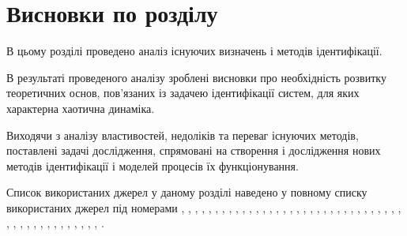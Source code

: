 

\section{Висновки по розділу \thechapter}%


В цьому розділі проведено аналіз існуючих визначень і методів
ідентифікації.

В результаті проведеного аналізу зроблені висновки про
необхідність розвитку теоретичних основ, пов'язаних із
задачею ідентифікації систем, для яких характерна хаотична
динаміка.

Виходячи з аналізу властивостей, недоліків та переваг існуючих методів,
поставлені задачі дослідження, спрямовані на створення і
дослідження нових методів ідентифікації і моделей процесів
їх функціонування.

Список використаних джерел у даному розділі наведено у повному
списку використаних джерел під номерами
\cite{adopt_cont_sys},
\cite{andronov_vitt_haikin},
\cite{atu_phd_thesis},
\cite{auto_optim_intask},
\cite{bodyan_adapt_viyavl},
\cite{borcov},
\cite{chen_nls_id_radial_basis},
\cite{chen_nn_for_nls_mod},
\cite{chernavskii_syn_info},
\cite{deith_method_id_ds},
\cite{dmitriev_trans_chaos_lowpower},
\cite{eykhoff_id_base},
\cite{eykhoff_modern_id},
\cite{gladkov_optim_nongrad},
\cite{gropp_methods_id},
\cite{ivah_int_meth_direct},
\cite{ivanov_stoh_alg_int},
\cite{karabutov_adapt_id_sys},
\cite{koltsova_nl_dyn_chem},
\cite{kozlov_nosearch_sns},
\cite{kras_dyn_nsn},
\cite{kubik_nlsc},
\cite{kuznetsov_dyn_chaos},
\cite{leondes_modern_tu},
\cite{lung_id_sys},
\cite{magni_theory_dyn_chaos},
\cite{mai_adopt_meth_direct},
\cite{mai_iss_adop_alg_etalon},
\cite{mai_sear_meth_akt_id_ns},
\cite{mai_syntez_adop_id},
\cite{medved_nepar_alg_id_nds},
\cite{mich_92},
\cite{mich_upr_prost_mech},
\cite{moon_chaotic_vibr},
\cite{narendra_id_ctl_ds_nn},
\cite{nelles_nlsys_id},
\cite{patra_nds_id_cheb},
\cite{prigogine_from_existent},
\cite{raibman_id_obj_ctl},
\cite{rastr_adop_complex_sys},
\cite{rastr_intro},
\cite{rastr_rand_search},
\cite{rastr_rand_search_adopt},
\cite{rastr_seu},
\cite{rastr_stat_meth_search},
\cite{saliga_id_ctl_black},
\cite{vukobr_nonadopt},
\cite{zadeh_id_1956}.




